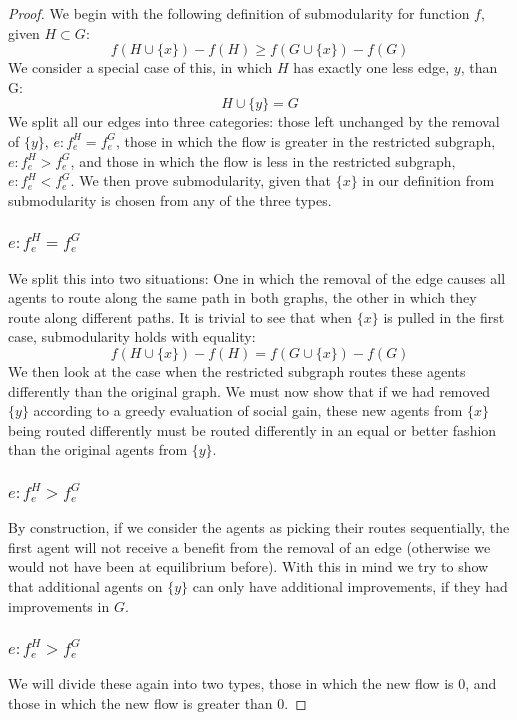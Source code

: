 \documentclass[a4paper,12pt]{article}
\begin{document}
\begin{proof}
We begin with the following definition of submodularity for function $f$, given $H \subset G$:
%
$$
f(H \cup \{ x \}) - f(H) \geq f(G \cup \{ x \}) - f(G)
$$
%
We consider a special case of this, in which $H$ has exactly one less edge, $y$, than G:
%
$$
H \cup \{ y \} = G
$$
%
We split all our edges into three categories: those left unchanged by the removal of $\{ y \}$,  $e: f_e^H = f_e^G$, those in which the flow is greater in the restricted subgraph, $e: f_e^H > f_e^G$, and those in which the flow is less in the restricted subgraph, $e: f_e^H < f_e^G$. We then prove submodularity, given that $\{ x \}$ in our definition from submodularity is chosen from any of the three types.

\subsubsection*{$e: f_e^H = f_e^G$}
We split this into two situations: One in which the removal of the edge causes all agents to route along the same path in both graphs, the other in which they route along different paths. It is trivial to see that when $\{ x \}$ is pulled in the first case, submodularity holds with equality:
$$
f(H \cup \{ x \}) - f(H) = f(G \cup \{ x \}) - f(G)
$$
%
We then look at the case when the restricted subgraph routes these agents differently than the original graph. We must now show that if we had removed $\{ y \}$ according to a greedy evaluation of social gain, these new agents from $\{ x \}$ being routed differently must be routed differently in an equal or better fashion than the original agents from $\{ y \}$.

\subsubsection*{$e: f_e^H > f_e^G$}

By construction, if we consider the agents as picking their routes sequentially, the first agent will not receive a benefit from the removal of an edge (otherwise we would not have been at equilibrium before). With this in mind we try to show that additional agents on $\{ y \}$ can only have additional improvements, if they had improvements in $G$.

\subsubsection*{$e: f_e^H > f_e^G$}
We will divide these again into two types, those in which the new flow is 0, and those in which the new flow is greater than 0.


\end{proof}
\end{document}
